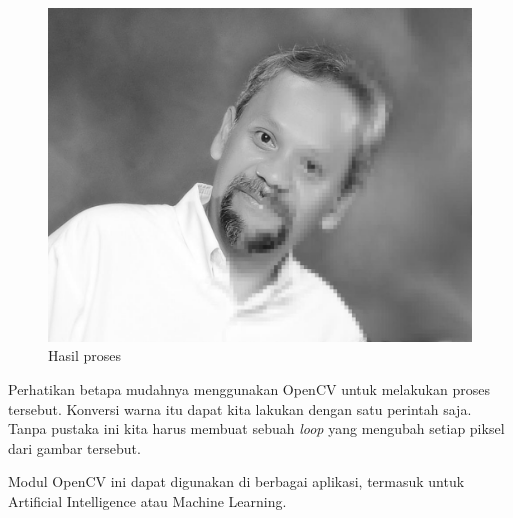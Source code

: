 \begin{figure}
\includegraphics[width=1.0\linewidth]{graphics/br-pixel-grey.png}
\caption{Hasil proses}
\end{figure}

Perhatikan betapa mudahnya menggunakan OpenCV untuk melakukan proses tersebut.
Konversi warna itu dapat kita lakukan dengan satu perintah saja.
Tanpa pustaka ini kita harus membuat sebuah {\em loop} yang mengubah
setiap piksel dari gambar tersebut.

Modul OpenCV ini dapat digunakan di berbagai aplikasi, termasuk untuk
Artificial Intelligence atau Machine Learning.
